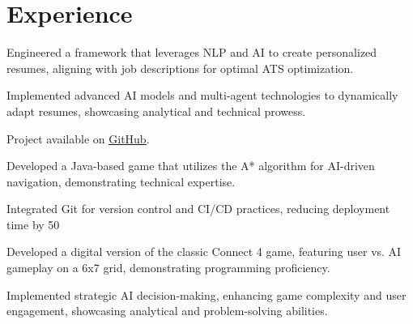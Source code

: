 \section{Experience}


    \begin{tightemize}
        \item Engineered a framework that leverages NLP and AI to create personalized resumes, aligning with job descriptions for optimal ATS optimization.
        \item Implemented advanced AI models and multi-agent technologies to dynamically adapt resumes, showcasing analytical and technical prowess.
        \item Project available on \href{https://github.com/vmsaif/ats-pass-ai}{\ul{GitHub}}.
    \end{tightemize}



    \begin{tightemize}
        \item Developed a Java-based game that utilizes the A* algorithm for AI-driven navigation, demonstrating technical expertise.
        \item Integrated Git for version control and CI/CD practices, reducing deployment time by 50%
    \end{tightemize}



    \begin{tightemize}
        \item Developed a digital version of the classic Connect 4 game, featuring user vs. AI gameplay on a 6x7 grid, demonstrating programming proficiency.
        \item Implemented strategic AI decision-making, enhancing game complexity and user engagement, showcasing analytical and problem-solving abilities.
    \end{tightemize}
